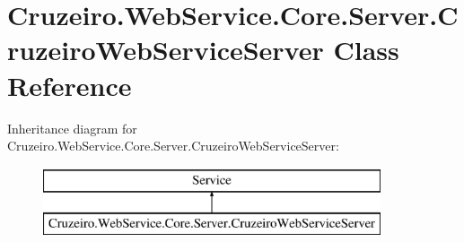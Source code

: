 \hypertarget{class_cruzeiro_1_1_web_service_1_1_core_1_1_server_1_1_cruzeiro_web_service_server}{}\section{Cruzeiro.\+Web\+Service.\+Core.\+Server.\+Cruzeiro\+Web\+Service\+Server Class Reference}
\label{class_cruzeiro_1_1_web_service_1_1_core_1_1_server_1_1_cruzeiro_web_service_server}
Inheritance diagram for Cruzeiro.\+Web\+Service.\+Core.\+Server.\+Cruzeiro\+Web\+Service\+Server\+:\begin{figure}[H]
\begin{center}
\leavevmode
\includegraphics[height=2.000000cm]{class_cruzeiro_1_1_web_service_1_1_core_1_1_server_1_1_cruzeiro_web_service_server}
\end{center}
\end{figure}
